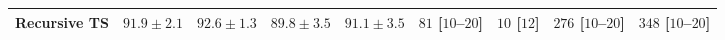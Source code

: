 \begin{tabular}{l|cccc|cccc|}
Recursive TS & {\cellcolor[HTML]{045687}} \color[HTML]{F1F1F1} $91.9\pm 2.1$ & {\cellcolor[HTML]{03517E}} \color[HTML]{F1F1F1} $92.6\pm 1.3$ & {\cellcolor[HTML]{04649D}} \color[HTML]{F1F1F1} $89.8\pm 3.5$ & {\cellcolor[HTML]{045C90}} \color[HTML]{F1F1F1} $91.1\pm 3.5$ & {\cellcolor[HTML]{FDE2DF}} \color[HTML]{000000} $81$ [$10$--$20$] & {\cellcolor[HTML]{FFF5F1}} \color[HTML]{000000} $10$ [$12$] & {\cellcolor[HTML]{FA97B2}} \color[HTML]{000000} $276$ [$10$--$20$] & {\cellcolor[HTML]{F769A1}} \color[HTML]{F1F1F1} $348$ [$10$--$20$] \\
\cline{1-9}
\bottomrule
\end{tabular}
